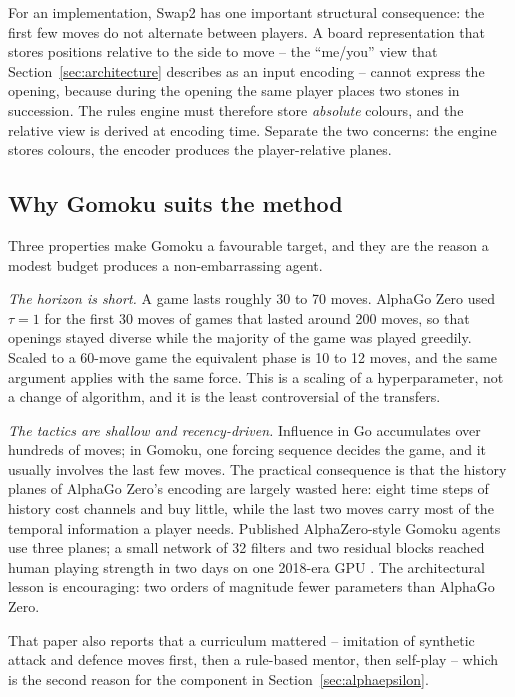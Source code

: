 For an implementation, Swap2 has one important structural consequence: the first
few moves do not alternate between players. A board representation that stores
positions relative to the side to move -- the ``me/you'' view that
Section~\ref{sec:architecture} describes as an input encoding -- cannot express
the opening, because during the opening the same player places two stones in
succession. The rules engine must therefore store \emph{absolute} colours, and
the relative view is derived at encoding time. Separate the two concerns: the
engine stores colours, the encoder produces the player-relative planes.

\subsection{Why Gomoku suits the method}
\label{sec:gomoku-suits}

Three properties make Gomoku a favourable target, and they are the reason a
modest budget produces a non-embarrassing agent.

\emph{The horizon is short.} A game lasts roughly 30 to 70 moves. AlphaGo Zero
used $\tau = 1$ for the first 30 moves of games that lasted around 200 moves, so
that openings stayed diverse while the majority of the game was played greedily.
Scaled to a 60-move game the equivalent phase is 10 to 12 moves, and the same
argument applies with the same force. This is a scaling of a hyperparameter, not
a change of algorithm, and it is the least controversial of the transfers.

\emph{The tactics are shallow and recency-driven.} Influence in Go accumulates
over hundreds of moves; in Gomoku, one forcing sequence decides the game, and it
usually involves the last few moves. The practical consequence is that the
history planes of AlphaGo Zero's encoding are largely wasted here: eight time
steps of history cost channels and buy little, while the last two moves carry
most of the temporal information a player needs. Published AlphaZero-style
Gomoku agents use three planes; a small network of 32 filters and two residual
blocks reached human playing strength in two days on one 2018-era GPU
\citep{xie2018alphagomoku}. The architectural lesson is encouraging: two orders of
magnitude fewer parameters than AlphaGo Zero.

That paper also reports that a curriculum mattered -- imitation of synthetic
attack and defence moves first, then a rule-based mentor, then self-play -- which
is the second reason for the component in Section~\ref{sec:alphaepsilon}.

